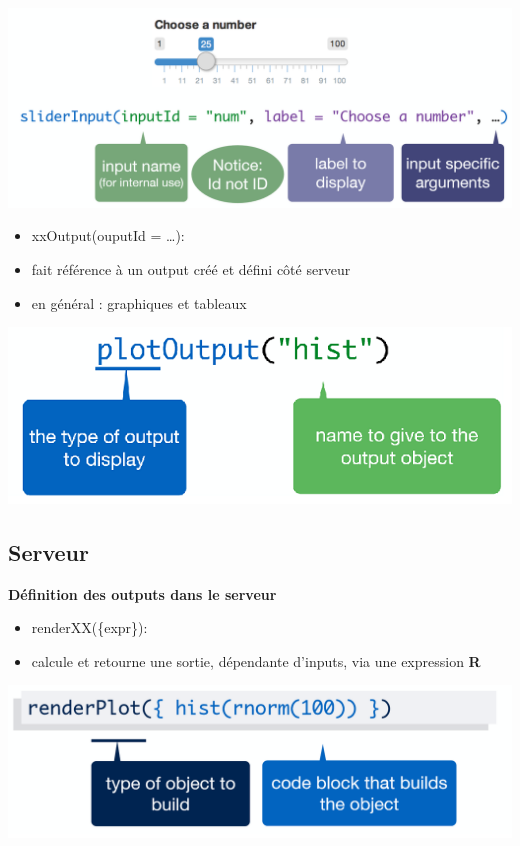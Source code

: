 \documentclass[]{article}
\begin{document}
\includegraphics{img/xxInput.png}

\begin{itemize}
\item
  xxOutput(ouputId = \ldots{}):
\item
  fait référence à un output créé et défini côté serveur
\item
  en général : graphiques et tableaux
\end{itemize}

\includegraphics{img/xxOutput.png}

\subsection{Serveur}\label{serveur}

\textbf{Définition des outputs dans le serveur}

\begin{itemize}
\item
  renderXX(\{expr\}):
\item
  calcule et retourne une sortie, dépendante d'inputs, via une
  expression \textbf{R}
\end{itemize}

\includegraphics{img/renderXX.png}
\end{document}
